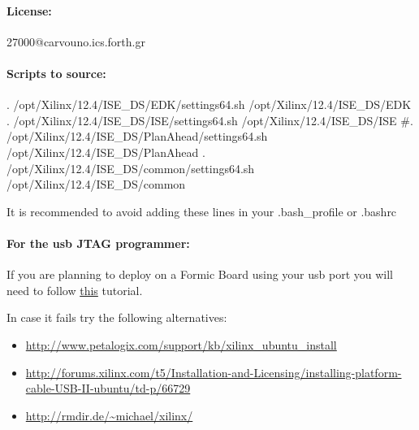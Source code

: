 \documentclass[
a4paper,
12pt,
]{report}
\begin{document}
\paragraph{License:} 27000@carvouno.ics.forth.gr

\paragraph{Scripts to source:}
\begin{bash}
. /opt/Xilinx/12.4/ISE_DS/EDK/settings64.sh /opt/Xilinx/12.4/ISE_DS/EDK
. /opt/Xilinx/12.4/ISE_DS/ISE/settings64.sh /opt/Xilinx/12.4/ISE_DS/ISE
#. /opt/Xilinx/12.4/ISE_DS/PlanAhead/settings64.sh /opt/Xilinx/12.4/ISE_DS/PlanAhead
. /opt/Xilinx/12.4/ISE_DS/common/settings64.sh /opt/Xilinx/12.4/ISE_DS/common
\end{bash}

It is recommended to avoid adding these lines in your .bash\_profile or
.bashrc

\paragraph{For the usb JTAG programmer:}
If you are planning to deploy on a Formic Board using your usb port
you will need to follow
\href{http://www.george-smart.co.uk/wiki/Xilinx_JTAG_Linux}{this}
tutorial.


In case it fails try the following alternatives:
\begin{itemize}
\item \url{http://www.petalogix.com/support/kb/xilinx_ubuntu_install}
\item \url{http://forums.xilinx.com/t5/Installation-and-Licensing/installing-platform-cable-USB-II-ubuntu/td-p/66729}
\item \url{http://rmdir.de/~michael/xilinx/}
\end{itemize}
\end{document}

